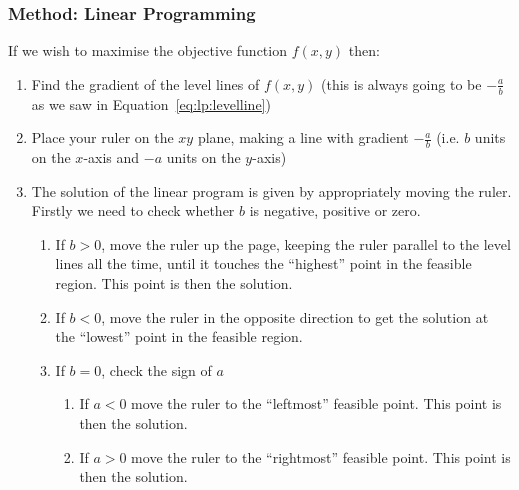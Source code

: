 \subsubsection{Method: Linear Programming}
If we wish to maximise the objective function $f(x,y)$ then:
\begin{enumerate}
\item Find the gradient of the level lines of $f(x,y)$ (this is always going to be $-\frac{a}{b}$ as we saw in Equation~\ref{eq:lp:levelline})
\item Place your ruler on the $xy$ plane, making a line with gradient $-\frac{a}{b}$ (i.e. $b$ units on the $x$-axis and $-a$ units on the $y$-axis)
\item The solution of the linear program is given by appropriately moving the ruler. Firstly we need to check whether $b$ is negative, positive or zero.
\begin{enumerate}
\item If $b>0$, move the ruler up the page, keeping the ruler parallel to the level lines all the time, until it touches the ``highest'' point in the feasible region. This point is then the solution.
\item If $b<0$, move the ruler in the opposite direction to get the solution at the ``lowest'' point in the feasible region.
\item If $b=0$, check the sign of $a$
\begin{enumerate}
\item If $a<0$ move the ruler to the ``leftmost'' feasible point. This point is then the solution.
\item If $a>0$ move the ruler to the ``rightmost'' feasible point. This point is then the solution.
\end{enumerate}
\end{enumerate}
\end{enumerate}


